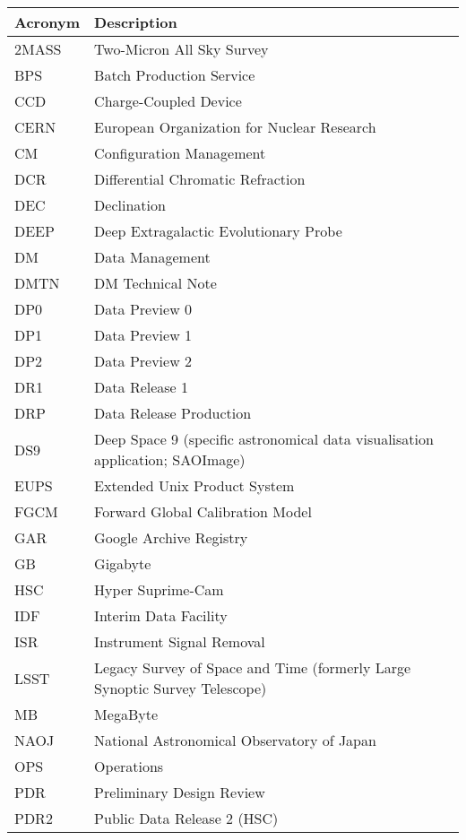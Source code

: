 \addtocounter{table}{-1}
\begin{longtable}{p{}p{}}\hline
\textbf{Acronym} & \textbf{Description}  \\\hline

2MASS & Two-Micron All Sky Survey \\\hline
BPS & Batch Production Service \\\hline
CCD & Charge-Coupled Device \\\hline
CERN & European Organization for Nuclear Research \\\hline
CM & Configuration Management \\\hline
DCR & Differential Chromatic Refraction \\\hline
DEC & Declination \\\hline
DEEP & Deep Extragalactic Evolutionary Probe \\\hline
DM & Data Management \\\hline
DMTN & DM Technical Note \\\hline
DP0 & Data Preview 0 \\\hline
DP1 & Data Preview 1 \\\hline
DP2 & Data Preview 2 \\\hline
DR1 & Data Release 1 \\\hline
DRP & Data Release Production \\\hline
DS9 & Deep Space 9 (specific astronomical data visualisation application; SAOImage) \\\hline
EUPS & Extended Unix Product System \\\hline
FGCM & Forward Global Calibration Model \\\hline
GAR & Google Archive Registry \\\hline
GB & Gigabyte \\\hline
HSC & Hyper Suprime-Cam \\\hline
IDF & Interim Data Facility \\\hline
ISR & Instrument Signal Removal \\\hline
LSST & Legacy Survey of Space and Time (formerly Large Synoptic Survey Telescope) \\\hline
MB & MegaByte \\\hline
NAOJ & National Astronomical Observatory of Japan \\\hline
OPS & Operations \\\hline
PDR & Preliminary Design Review \\\hline
PDR2 & Public Data Release 2 (HSC) \\\hline

\end{longtable}
